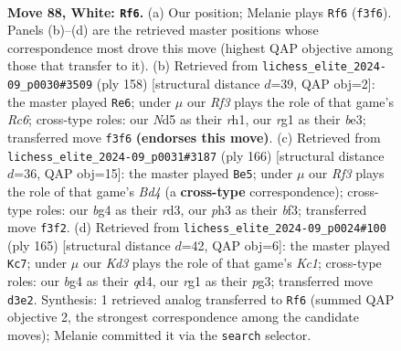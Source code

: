 \documentclass[11pt]{article}
\begin{document}
\clearpage

\begin{figure}[p]\centering
\begin{subfigure}{0.46\textwidth}\centering
\resizebox{\linewidth}{!}{%
\newchessgame
\chessboard[
  setfen={1B6/6k1/8/1P1N4/P3B1b1/3K1R1p/8/6r1 w - - 15 88},
  showmover=false,
  pgfstyle=straightmove, color=movearrow, markmove={f3-f6}
]}
\caption{}
\end{subfigure}\hfill
\begin{subfigure}{0.46\textwidth}\centering
\resizebox{\linewidth}{!}{%
\newchessgame
\chessboard[
  setfen={8/3k4/2R3K1/3B4/2P2p2/4bP2/8/7r w - - 49 80},
  showmover=false,
  pgfstyle=straightmove, color=movearrow, markmove={c6-e6}
]}
\caption{}
\end{subfigure}
\\[4pt]
\begin{subfigure}{0.46\textwidth}\centering
\resizebox{\linewidth}{!}{%
\newchessgame
\chessboard[
  setfen={2k5/5R2/8/2K4p/2PB4/3r1bP1/8/8 w - - 57 84},
  showmover=false,
  pgfstyle=straightmove, color=movearrow, markmove={d4-e5}
]}
\caption{}
\end{subfigure}\hfill
\begin{subfigure}{0.46\textwidth}\centering
\resizebox{\linewidth}{!}{%
\newchessgame
\chessboard[
  setfen={2k5/3b4/2r5/2P2p2/3Qp3/6P1/8/4K3 b - - 54 83},
  showmover=false,
  pgfstyle=straightmove, color=movearrow, markmove={c8-c7}
]}
\caption{}
\end{subfigure}
\caption{\textbf{Move 88, White: \texttt{Rf6}.} (a) Our position; Melanie plays \texttt{Rf6} (\texttt{f3f6}). Panels (b)--(d) are the retrieved master positions whose correspondence most drove this move (highest QAP objective among those that transfer to it). (b) Retrieved from \texttt{lichess\_elite\_2024-09\_p0030\#3509} (ply 158) [structural distance $d$=39, QAP obj=2]: the master played \texttt{Re6}; under $\mu$ our \emph{Rf3} plays the role of that game's \emph{Rc6}; cross-type roles: our \emph{N}d5 as their \emph{r}h1, our \emph{r}g1 as their \emph{b}e3; transferred move \texttt{f3f6} \textbf{(endorses this move)}. (c) Retrieved from \texttt{lichess\_elite\_2024-09\_p0031\#3187} (ply 166) [structural distance $d$=36, QAP obj=15]: the master played \texttt{Be5}; under $\mu$ our \emph{Rf3} plays the role of that game's \emph{Bd4} (a \textbf{cross-type} correspondence); cross-type roles: our \emph{b}g4 as their \emph{r}d3, our \emph{p}h3 as their \emph{b}f3; transferred move \texttt{f3f2}. (d) Retrieved from \texttt{lichess\_elite\_2024-09\_p0024\#100} (ply 165) [structural distance $d$=42, QAP obj=6]: the master played \texttt{Kc7}; under $\mu$ our \emph{Kd3} plays the role of that game's \emph{Kc1}; cross-type roles: our \emph{b}g4 as their \emph{q}d4, our \emph{r}g1 as their \emph{p}g3; transferred move \texttt{d3e2}. Synthesis: 1 retrieved analog transferred to \texttt{Rf6} (summed QAP objective 2, the strongest correspondence among the candidate moves); Melanie committed it via the \texttt{search} selector.}
\label{fig:thought-m174}
\end{figure}
\end{document}
